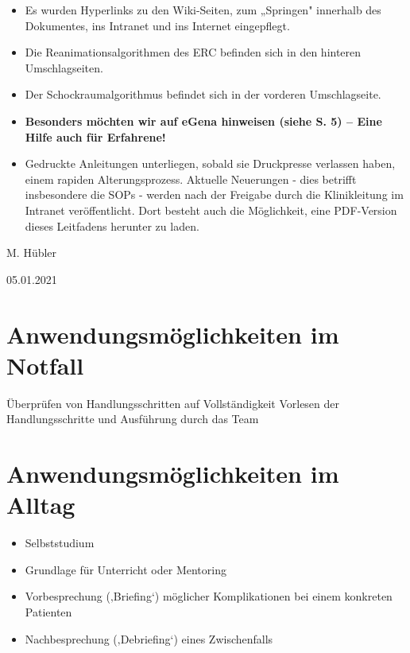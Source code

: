 \documentclass[
]{book}
\providecommand{\tightlist}{%
  \setlength{\itemsep}{0pt}\setlength{\parskip}{0pt}}
\begin{document}
\begin{itemize}
\item
  Es wurden Hyperlinks zu den Wiki-Seiten, zum „Springen" innerhalb des Dokumentes, ins Intranet und ins Internet eingepflegt.
\item
  Die Reanimationsalgorithmen des ERC befinden sich in den hinteren Umschlagseiten.
\item
  Der Schockraumalgorithmus befindet sich in der vorderen Umschlagseite.
\item
  \textbf{Besonders möchten wir auf eGena hinweisen (siehe S. 5) -- Eine Hilfe auch für Erfahrene!}
\item
  Gedruckte Anleitungen unterliegen, sobald sie Druckpresse verlassen haben, einem rapiden Alterungsprozess. Aktuelle Neuerungen - dies betrifft insbesondere die SOPs - werden nach der Freigabe durch die Klinikleitung im Intranet veröffentlicht. Dort besteht auch die Möglichkeit, eine PDF-Version dieses Leitfadens herunter zu laden.
\end{itemize}

M. Hübler

05.01.2021

\hypertarget{anwendungsmuxf6glichkeiten-im-notfall}{%
\section*{Anwendungsmöglichkeiten im Notfall}\label{anwendungsmuxf6glichkeiten-im-notfall}}

Überprüfen von Handlungsschritten auf Vollständigkeit
Vorlesen der Handlungsschritte und Ausführung durch das Team

\hypertarget{anwendungsmuxf6glichkeiten-im-alltag}{%
\section*{Anwendungsmöglichkeiten im Alltag}\label{anwendungsmuxf6glichkeiten-im-alltag}}

\begin{itemize}
\tightlist
\item
  Selbststudium
\item
  Grundlage für Unterricht oder Mentoring
\item
  Vorbesprechung (‚Briefing`) möglicher Komplikationen bei einem konkreten Patienten
\item
  Nachbesprechung (‚Debriefing`) eines Zwischenfalls
\end{itemize}
\end{document}
